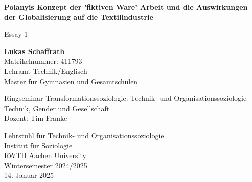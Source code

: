 \documentclass[12pt]{article}
\begin{document}
\thispagestyle{empty}
    \begin{center}
            
        \LARGE
        \textbf{Polanyis Konzept der 'fiktiven Ware' Arbeit und die Auswirkungen der Globalisierung auf die Textilindustrie}
            
        \vspace{0.2cm}
        \Large
        Essay 1

        \vspace{2cm}
            
        \textbf{Lukas Schaffrath}\\
        Matrikelnummer: 411793\\
        Lehramt Technik/Englisch\\
        Master für Gymnasien und Gesamtschulen
            
        \vspace{2cm}
            
        Ringseminar Transformationssoziologie: Technik- und Organisationssoziologie\\
        Technik, Gender und Gesellschaft\\
        Dozent: Tim Franke
            
        \vspace{2cm}
            
            
        \Large
        Lehrstuhl für Technik- und Organisationssoziologie\\
        Institut für Soziologie\\
        RWTH Aachen University\\
        Wintersemester 2024/2025\\
        14. Januar 2025
            
    \end{center}




\newpage
\setcounter{page}{1}
\pagestyle{maintext}

\end{document}
